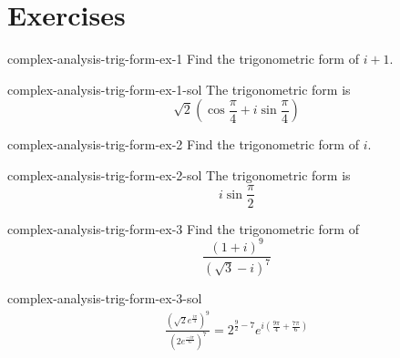 \documentclass[preview]{standalone}
\begin{document}
\genpage

\section{Exercises}

\begin{snippetexercise}{complex-analysis-trig-form-ex-1}{}
    Find the trigonometric form of \(i+1\).
\end{snippetexercise}

\begin{snippetsolution}{complex-analysis-trig-form-ex-1-sol}{}
    The trigonometric form is \[
        \sqrt{2}\left(\cos\frac{\pi}{4} + i\sin\frac{\pi}{4}\right)
    \]
\end{snippetsolution}

\begin{snippetexercise}{complex-analysis-trig-form-ex-2}{}
    Find the trigonometric form of \(i\).
\end{snippetexercise}

\begin{snippetsolution}{complex-analysis-trig-form-ex-2-sol}{}
    The trigonometric form is \[
        i\sin\frac{\pi}{2}
    \]
\end{snippetsolution}

\begin{snippetexercise}{complex-analysis-trig-form-ex-3}{}
    Find the trigonometric form of
    \[
        \frac{{(1+i)}^9}{{(\sqrt{3}-i)}^7}
    \]
\end{snippetexercise}

\begin{snippetsolution}{complex-analysis-trig-form-ex-3-sol}{}
    \begin{align*}
        \frac{{\left(\sqrt{2}e^{\frac{i\pi}{4}}\right)}^9}{{\left(2e^{\frac{-i\pi}{6}}\right)}^7}
        = 2^{\frac{9}{2}-7}e^{i\left(\frac{9\pi}{4} + \frac{7\pi}{6}\right)}
    \end{align*}
\end{snippetsolution}
\end{document}
